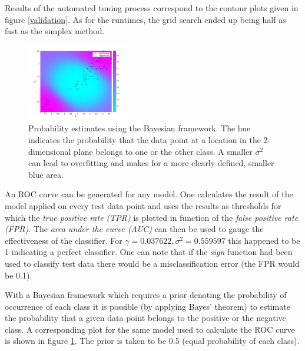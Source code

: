 Results of the automated tuning process correspond to the contour plots given in figure \ref{validation}. As for the runtimes, the grid search ended up being half as fast as the simplex method.

\begingroup
\setlength{\columnsep}{0.75cm}
\setlength{\intextsep}{0cm}
\begin{figure}
\centering
\includegraphics[width=0.4\textwidth]{../src/figures/iris/bayesian/bayesian_probabilities}
\caption{Probability estimates using the Bayesian framework. The hue indicates the probability that the data point at a location in the 2-dimensional plane belongs to one or the other class. A smaller $\sigma^2$ can lead to overfitting and makes for a more clearly defined, smaller blue area.}
\label{irisbayesian}
\end{figure}

\vspace{0cm}

An ROC curve can be generated for any model. One calculates the result of the model applied on every test data point and uses the results as thresholds for which the \textit{true positive rate (TPR)} is plotted in function of the \textit{false positive rate (FPR)}. The \textit{area under the curve (AUC)} can then be used to gauge the effectiveness of the classifier. For $\gamma=0.037622,\sigma^2=0.559597$ this happened to be 1 indicating a perfect classifier. One can note that if the \textit{sign} function had been used to classify test data there would be a misclassification error (the FPR would be 0.1).

\par With a Bayesian framework which requires a prior denoting the probability of occurrence of each class it is possible (by applying Bayes' theorem) to estimate the probability that a given data point belongs to the positive or the negative class. A corresponding plot for the same model used to calculate the ROC curve is shown in figure \ref{irisbayesian}. The prior is taken to be 0.5 (equal probability of each class).

\endgroup

